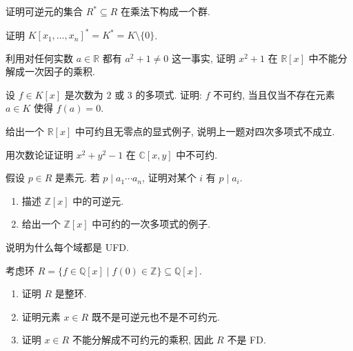 \BookExerciseHeading
\begin{BookExercises}
  \item\label{ex:units-form-group} 证明可逆元的集合 $R^{*}\subseteq R$ 在乘法下构成一个群.
  \item\label{ex:units-polynomial-ring-over-field} 证明 $K[x_{1},\ldots,x_{n}]^{*}=K^{*}=K\setminus\{0\}$.
  \item\label{ex:quadratic-no-real-linear-factors} 利用对任何实数 $a\in\mathbb{R}$ 都有 $a^{2}+1\ne0$ 这一事实, 证明 $x^{2}+1$ 在 $\mathbb{R}[x]$ 中不能分解成一次因子的乘积.
  \item\label{ex:quadratic-cubic-irreducible-root-test} 设 $f\in K[x]$ 是次数为 $2$ 或 $3$ 的多项式. 证明: $f$ 不可约, 当且仅当不存在元素 $a\in K$ 使得 $f(a)=0$.
  \item\label{ex:quartic-no-real-zeros-reducible} 给出一个 $\mathbb{R}[x]$ 中可约且无零点的显式例子, 说明上一题对四次多项式不成立.
  \item\label{ex:circle-polynomial-irreducible-over-complex} 用次数论证证明 $x^{2}+y^{2}-1$ 在 $\mathbb{C}[x,y]$ 中不可约.
  \item\label{ex:prime-divides-one-of-factors} 假设 $p\in R$ 是素元. 若 $p\mid a_{1}\cdots a_{n}$, 证明对某个 $i$ 有 $p\mid a_{i}$.
  \item\label{ex:units-zz-polynomial-and-reducible-linear}
    \begin{enumerate}[label=(\alph*)]
      \item 描述 $\mathbb{Z}[x]$ 中的可逆元.
      \item 给出一个 $\mathbb{Z}[x]$ 中可约的一次多项式的例子.
    \end{enumerate}
  \item\label{ex:field-is-ufd} 说明为什么每个域都是 UFD.
  \item\label{ex:domain-without-factorization} 考虑环 $R=\{f\in\mathbb{Q}[x]\mid f(0)\in\mathbb{Z}\}\subseteq\mathbb{Q}[x]$.
    \begin{enumerate}[label=(\alph*)]
      \item 证明 $R$ 是整环.
      \item 证明元素 $x\in R$ 既不是可逆元也不是不可约元.
      \item 证明 $x\in R$ 不能分解成不可约元的乘积, 因此 $R$ 不是 FD.
    \end{enumerate}
\end{BookExercises}
